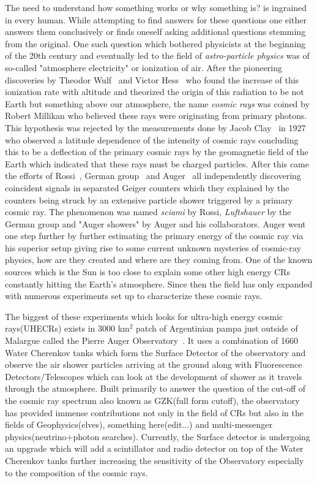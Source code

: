 The need to understand how something works or why something is?  is ingrained in every human. While attempting to find answers for these questions one either answers them conclusively or finds oneself asking additional questions stemming from the original. One such question which bothered physicists at the beginning of the 20th century and eventually led to the field of \textit{astro-particle physics} was of so-called "atmosphere electricity" or ionization of air. After the pioneering discoveries by Theodor Wulf~\cite{} and Victor Hess~\cite{} who found the increase of this ionization rate with altitude and theorized the origin of this radiation to be not Earth but something above our atmosphere, the name \textit{cosmic rays} was coined by Robert Millikan who believed these rays were originating from primary photons. This hypothesis was rejected by the measurements done by Jacob Clay~\cite{} in 1927 who observed a latitude dependence of the intensity of cosmic rays concluding this to be a deflection of the primary cosmic rays by the geomagnetic field of the Earth which indicated that these rays must be charged particles. After this came the efforts of Rossi~\cite{}, German group~\cite{} and Auger~\cite{} all independently discovering coincident signals in separated Geiger counters which they explained by the counters being struck by an extensive particle shower triggered by a primary cosmic ray. The phenomenon was named \textit{sciami} by Rossi, \textit{Luftshauer} by the German group and "Auger showers" by Auger and his collaborators. Auger went one step further by further estimating the primary energy of the cosmic ray via his superior setup giving rise to some current unknown mysteries of cosmic-ray physics, how are they created and where are they coming from. One of the known sources which is the Sun is too close to explain some other high energy CRs constantly hitting the Earth's atmosphere. Since then the field has only expanded with numerous experiments set up to characterize these cosmic rays. 

The biggest of these experiments which looks for ultra-high energy cosmic rays(UHECRs) exists in 3000 km$^2$ patch of Argentinian pampa just outside of Malargue called the Pierre Auger Observatory~\cite{}. It uses a combination of 1660 Water Cherenkov tanks which form the Surface Detector of the observatory and observe the air shower particles arriving at the ground along with Fluorescence Detectors/Telescopes which can look at the development of shower as it travels through the atmosphere. Built primarily to answer the question of the cut-off of the cosmic ray spectrum also known as GZK(full form cutoff), the observatory has provided immense contributions not only in the field of CRs but also in the fields of Geophysics(elves), something here(edit...) and multi-messenger physics(neutrino+photon searches). Currently, the Surface detector is undergoing an upgrade which will add a scintillator and radio detector on top of the Water Cherenkov tanks further increasing the sensitivity of the Observatory especially to the composition of the cosmic rays.

